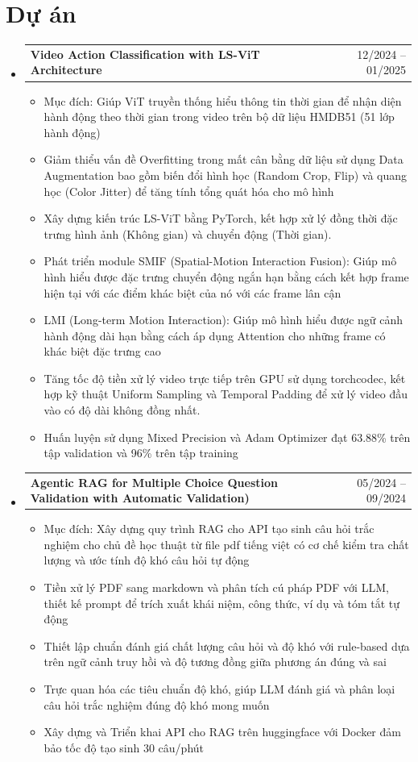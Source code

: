 \documentclass[letterpaper,11pt]{article}
\makeatletter
\newcommand{\resumeItem}[1]{
	\item\small{
	{#1 \vspace{-2pt}}
	}
}
\newcommand{\resumeProjectHeading}[2]{
	\item
	\begin{tabular*}{0.97\textwidth}{l@{\extracolsep{\fill}}r}
		\small#1 & #2 \\
	\end{tabular*}\vspace{-7pt}
}
\newcommand{\resumeSubHeadingListStart}{\begin{itemize}[leftmargin=0.15in, label={}]}
\newcommand{\resumeSubHeadingListEnd}{\end{itemize}}
\newcommand{\resumeItemListStart}{\begin{itemize}}
\newcommand{\resumeItemListEnd}{\end{itemize}\vspace{-5pt}}
\makeatother
\begin{document}
\section{Dự án}
	\resumeSubHeadingListStart
		\resumeProjectHeading
		        {\textbf{Video Action Classification with LS-ViT Architecture}}{12/2024 -- 01/2025}
	            	 \resumeItemListStart
			            \resumeItem{Mục đích: Giúp ViT truyền thống hiểu thông tin thời gian để nhận diện hành động theo thời gian trong video trên bộ dữ liệu HMDB51 (51 lớp hành động)}
			            \resumeItem{Giảm thiểu vấn đề Overfitting trong mất cân bằng dữ liệu sử dụng Data Augmentation bao gồm biến đổi hình học (Random Crop, Flip) và quang học (Color Jitter) để tăng tính tổng quát hóa cho mô hình}
	 		            \resumeItem{Xây dựng kiến trúc LS-ViT bằng PyTorch, kết hợp xử lý đồng thời đặc trưng hình ảnh (Không gian) và chuyển động (Thời gian).}
				  \resumeItem{Phát triển module SMIF (Spatial-Motion Interaction Fusion): Giúp mô hình hiểu được đặc trưng chuyển động ngắn hạn bằng cách kết hợp frame hiện tại với các điểm khác biệt của nó với các frame lân cận}
	 		            \resumeItem{LMI (Long-term Motion Interaction): Giúp mô hình hiểu được ngữ cảnh hành động dài hạn bằng cách áp dụng Attention cho những frame có khác biệt đặc trưng cao}
	 		            \resumeItem{Tăng tốc độ tiền xử lý video trực tiếp trên GPU sử dụng torchcodec, kết hợp kỹ thuật Uniform Sampling và Temporal Padding để xử lý video đầu vào có độ dài không đồng nhất.}
			            \resumeItem{Huấn luyện sử dụng Mixed Precision và Adam Optimizer đạt 63.88\% trên tập validation và 96\% trên tập training}
			\resumeItemListEnd


		\resumeProjectHeading
		        {\textbf{Agentic RAG for Multiple Choice Question Validation with Automatic Validation)}}{05/2024 -- 09/2024}
	            	 \resumeItemListStart
			            \resumeItem{Mục đích: Xây dựng quy trình RAG cho API tạo sinh câu hỏi trắc nghiệm cho chủ đề học thuật từ file pdf tiếng việt có cơ chế kiểm tra chất lượng và ước tính độ khó câu hỏi tự động}
	 		            \resumeItem{Tiền xử lý PDF sang markdown và phân tích cú pháp PDF với LLM, thiết kế prompt để trích xuất khái niệm, công thức, ví dụ và tóm tắt tự động}
				  \resumeItem{Thiết lập chuẩn đánh giá chất lượng câu hỏi và độ khó với rule-based dựa trên ngữ cảnh truy hồi và độ tương đồng giữa phương án đúng và sai}
	 		            \resumeItem{Trực quan hóa các tiêu chuẩn độ khó, giúp LLM đánh giá và phân loại câu hỏi trắc nghiệm đúng độ khó mong muốn}
			            \resumeItem{Xây dựng và Triển khai API cho RAG trên huggingface với Docker đảm bảo tốc độ tạo sinh 30 câu/phút}
			\resumeItemListEnd
	\resumeSubHeadingListEnd
\end{document}
